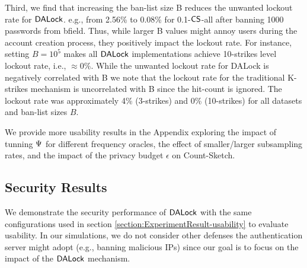 Third, we find that increasing the ban-list size B reduces the unwanted lockout rate for $\mathsf{DALock}$. e.g., from 2.56\% to 0.08\% for 0.1-$\mathsf{CS}$-all after banning 1000 passwords from bfield. Thus, while larger B values might annoy users during the account creation process, they positively impact the lockout rate. For instance, setting $B=10^5$ makes all $\mathsf{DALock}$ implementations achieve 10-strikes level lockout rate, i.e., $\approx 0\%$. While the unwanted lockout rate for DALock is negatively correlated with B we note that the lockout rate for the traditional K-strikes mechanism is uncorrelated with B since the hit-count is ignored. The lockout rate was approximately 4\% (3-strikes) and 0\% (10-strikes) for all datasets and ban-list sizes $B$. %


We provide more usability results in the Appendix exploring the impact of tunning $\Psi$ for different frequency oracles, the effect of smaller/larger subsampling rates, and the impact of the privacy budget $\epsilon$ on Count-Sketch.









\subsection{Security Results} \label{section:ExperimentResult-security} 






We demonstrate the security performance of $\mathsf{DALock}$ with the same configurations used in section \ref{section:ExperimentResult-usability}  to evaluate usability. In our simulations, we do not consider other defenses the authentication server might adopt (e.g., banning malicious IPs) since our goal is to focus on the impact of the $\mathsf{DALock}$ mechanism.



